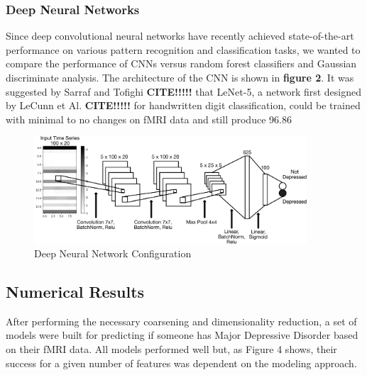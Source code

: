 \documentclass{article}[12pt]
\begin{document}
   \subsubsection{Deep Neural Networks}
   Since deep convolutional neural networks have recently achieved state-of-the-art performance on various pattern recognition and classification tasks, we wanted to compare the performance of CNNs versus random forest classifiers and Gaussian discriminate analysis. The architecture of the CNN is shown in \textbf{figure 2}.  It was suggested by Sarraf and Tofighi \textbf{CITE!!!!!} that LeNet-5, a network first designed by LeCunn et Al. \textbf{CITE!!!!!} for handwritten digit classification, could be trained with minimal to no changes on fMRI data and still produce 96.86%
   \begin{figure}[!htb]
   	\centering
   	\includegraphics[width=4in]{DNN_diagram_annotated.pdf}
   	\caption{Deep Neural Network Configuration}
   	\label{fig:dnnConfig}
   \end{figure}
   
   
   \subsection{Numerical Results}
   After performing the necessary coarsening and dimensionality reduction, a set of models were built for predicting if someone has Major Depressive Disorder based on their fMRI data.  All models performed well but, as Figure 4 shows, their success for a given number of features was dependent on the modeling approach. 
   
\end{document}
